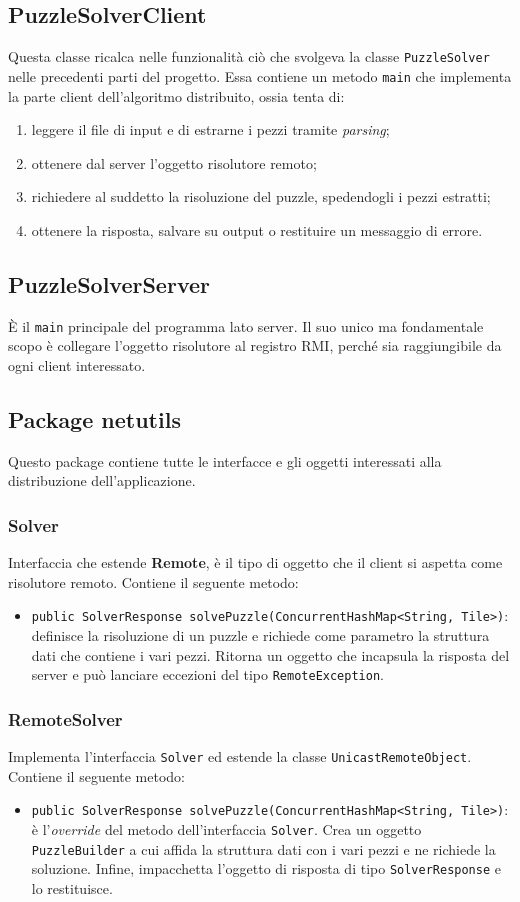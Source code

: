 \documentclass[a4paper, 12pt]{article}
\newcommand{\strong}[1]{ \textbf{#1}}
\begin{document}
\subsection{PuzzleSolverClient}
Questa classe ricalca nelle funzionalità ciò che svolgeva la classe
\verb|PuzzleSolver| nelle precedenti parti del progetto. Essa contiene un metodo
\verb|main| che implementa la parte client dell'algoritmo distribuito, ossia
tenta di:
\begin{enumerate}
\item leggere il file di input e di estrarne i pezzi tramite \emph{parsing};
\item ottenere dal server l'oggetto risolutore remoto;
\item richiedere al suddetto la risoluzione del puzzle, spedendogli i pezzi
estratti;
\item ottenere la risposta, salvare su output o restituire un messaggio di
errore.
\end{enumerate}
\subsection{PuzzleSolverServer}
È il \verb|main| principale del programma lato server. Il suo unico ma
fondamentale scopo è collegare l'oggetto risolutore al registro RMI, perché sia
raggiungibile da ogni client interessato.
\subsection{Package netutils}
Questo package contiene tutte le interfacce e gli oggetti interessati
alla distribuzione dell'applicazione.
\subsubsection{Solver}
Interfaccia che estende \strong{Remote}, è il tipo di oggetto che il client si
aspetta come risolutore remoto. Contiene il seguente metodo:
\begin{itemize}
\item \verb|public SolverResponse solvePuzzle(ConcurrentHashMap<String, Tile>)|:
\\ definisce la risoluzione di un puzzle e richiede come parametro la
struttura dati che contiene i vari pezzi. Ritorna un oggetto che incapsula la
risposta del server e può lanciare eccezioni del tipo \verb|RemoteException|.
\end{itemize}
\subsubsection{RemoteSolver}
Implementa l'interfaccia \verb|Solver| ed estende la classe
\verb|UnicastRemoteObject|. Contiene il seguente metodo:
\begin{itemize}
\item \verb|public SolverResponse solvePuzzle(ConcurrentHashMap<String, Tile>)|:
\\ è l'\emph{override} del metodo dell'interfaccia \verb|Solver|. Crea un
oggetto \verb|PuzzleBuilder| a cui affida la struttura dati con i vari pezzi e
ne richiede la soluzione. Infine, impacchetta l'oggetto di risposta di tipo
\verb|SolverResponse| e lo restituisce.
\end{itemize}
\end{document}
